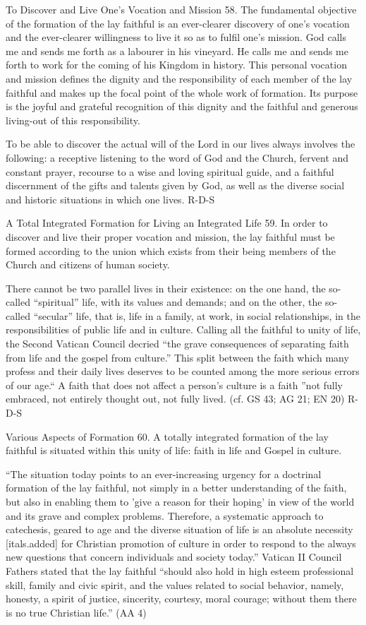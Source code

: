 \documentclass[oneside]{book}
\begin{document}
To Discover and Live One's Vocation and Mission
58. The fundamental objective of the formation of the lay faithful is an
ever-clearer discovery of one's vocation and the ever-clearer willingness to
live it so as to fulfil one's mission.
God calls me and sends me forth as a labourer in his vineyard. He calls me and
sends me forth to work for the coming of his Kingdom in history. This personal
vocation and mission defines the dignity and the responsibility of each member
of the lay faithful and makes up the focal point of the whole work of
formation.  Its purpose is the joyful and grateful recognition of this dignity
and the faithful and generous living-out of this responsibility.

To be able to discover the actual will of the Lord in our lives always involves
the following: a receptive listening to the word of God and the Church, fervent
and constant prayer, recourse to a wise and loving spiritual guide, and a
faithful discernment of the gifts and talents given by God, as well as the
diverse social and historic situations in which one lives.
R-D-S


A Total Integrated Formation for Living an Integrated Life
59. In order to discover and live their proper vocation and mission, the lay
faithful must be formed according to the union which exists from their being
members of the Church and citizens of human society.

There cannot be two parallel lives in their existence: on the one hand, the
so-called ``spiritual'' life, with its values and demands; and on the other, the
so-called ``secular'' life, that is, life in a family, at work, in social
relationships, in the responsibilities of public life and in culture.
Calling all the faithful to unity of life, the Second Vatican Council decried
``the grave consequences of separating faith from life and the gospel from
culture.'' This split between the faith which many profess and their daily lives
deserves to be counted among the more serious errors of our age.``  A faith that
does not affect a person's culture is a faith ''not fully embraced, not entirely
thought out, not fully lived. (cf. GS 43;  AG 21; EN 20)
R-D-S

Various Aspects of Formation
60. A totally integrated formation of the lay faithful is situated within this
unity of life: faith in life and Gospel in culture.

``The situation today points to an ever-increasing urgency for a doctrinal
formation of the lay faithful, not simply in a better understanding of the
faith, but also in enabling them to 'give a reason for their hoping' in view of
the world and its grave and complex problems. Therefore, a systematic approach
to catechesis, geared to age and the diverse situation of life is an absolute
necessity [itals.added] for Christian promotion of culture in order to respond
to the always new questions that concern individuals and society today.''
Vatican II Council Fathers stated that the lay faithful ``should also hold in
high esteem professional skill, family and civic spirit, and the values related
to social behavior, namely, honesty, a spirit of justice, sincerity, courtesy,
moral courage; without them there is no true Christian life.'' (AA 4)
\end{document}
